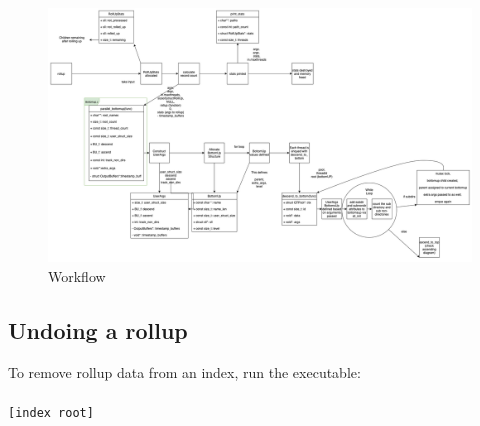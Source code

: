 \begin{figure} [!h]
  \centering \includegraphics[width=\textwidth]{images/rollup.png}
  \caption{\rollup Workflow}
  \label{fig:rollupworkflow}
\end{figure}

\subsection{Undoing a rollup}
To remove rollup data from an index, run the \unrollup executable:
\\\\
\indent \unrollup \texttt{[index root]}
